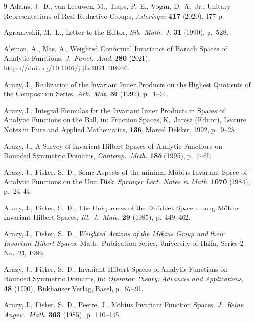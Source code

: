 \documentclass[10.5pt,reqno]{amsart}
\begin{document}
\begin{thebibliography}{9}
	Adams, J.\ D., van Leeuwen, M., Traps, P.\ E., Vogan, D.\ A.\ Jr., Unitary Representations of Real Reductive Groups, \emph{Asterisque} \textbf{417} (2020), 177 p.
	
	Agranovskii, M.\ L., Letter to the Editor, \emph{Sib.\ Math.\ J.} \textbf{31} (1990), p.~528.
	
	Aleman, A., Mas, A., Weighted Conformal Invariance of Banach Spaces of Analytic Functions, \emph{J.\ Funct.\ Anal.} \textbf{280} (2021), https://doi.org/10.1016/j.jfa.2021.108946.
	
	
	Arazy, J., Realization of the Invariant Inner Products on the Highest Quotients of the Composition Series,  \emph{Ark.\ Mat.} \textbf{30} (1992), p.~1--24.
	
	Arazy, J., Integral Formulas for the Invariant Inner Products in Spaces of Analytic Functions on the Ball, in: Function Spaces, K.\ Jarosz (Editor),  Lecture Notes in Pure and Applied Mathematics, \textbf{136}, Marcel Dekker, 1992, p.~9--23.
	
	Arazy, J., A Survey of Invariant Hilbert Spaces of Analytic Functions on Bounded Symmetric Domains, \emph{Contemp.\ Math.} \textbf{185} (1995), p.~7--65.
	
	
	Arazy, J., Fisher, S.\ D., Some Aspects of the minimal M\"obius Invariant Space of Analytic Functions on the Unit Disk, \emph{Springer Lect.\ Notes in Math.} \textbf{1070} (1984), p.~24--44.
	
	Arazy, J., Fisher, S.\ D., The Uniqueness of the Dirichlet Space among M\"obius Invariant Hilbert Spaces, \emph{Ill.\ J.\ Math.} \textbf{29} (1985), p.~449--462.
	
	Arazy, J., Fisher, S.\ D., \emph{Weighted Actions of the M\"obius Group and their Invariant  Hilbert Spaces}, Math.\ Publication Series, University of Haifa, Series 2 No.\ 23, 1989.
	
	Arazy, J., Fisher, S.\ D., Invariant Hilbert Spaces of Analytic Functions on Bounded Symmetric Domains, in: \emph{Operator Theory: Advances and Applications}, \textbf{48} (1990), Birkhauser Verlag, Basel, p.~67--91.
	
	Arazy, J., Fisher, S.\ D., Peetre, J., M\"obius Invariant Function Spaces, \emph{J.\ Reine Angew.\ Math.} \textbf{363} (1985), p.~110--145.
	

\end{thebibliography}
\end{document}
